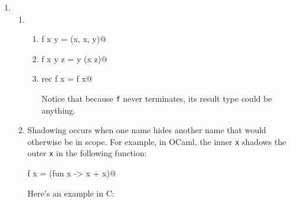 \documentclass[11pt]{article}
\begin{document}

  \begin{enumerate}

    \addtolength{\itemsep}{10mm}

    \item \begin{enumerate}

            \addtolength{\itemsep}{4mm}

            \item \begin{enumerate}

                    \addtolength{\itemsep}{2mm}

                    \item \verb@let f x y = (x, x, y)@

                    \item \verb@let f x y z = y (x z)@

                    \item \verb@let rec f x = f x@

                          \smallskip

                          Notice that because \texttt{f} never terminates,
                          its result type could be anything.

                  \end{enumerate}

            \item Shadowing occurs when one name hides another name that
                  would otherwise be in scope.  For example, in OCaml, the
                  inner \texttt{x} shadows the outer \texttt{x} in the
                  following function:

                  \vspace{-1mm}

                  \begin{center}

                    \verb@let f x = (fun x -> x + x)@

                  \end{center}

                  \medskip

                  Here's an example in C:\hspace{1mm}

                  \vspace{-4mm}


\end{enumerate}
\end{enumerate}
\end{document}
